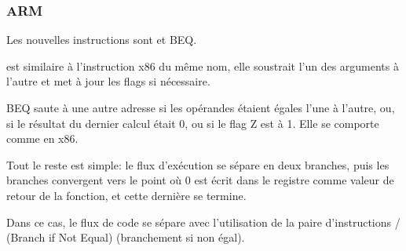 \subsubsection{ARM}





Les nouvelles instructions sont \CMP et \ac{BEQ}.

\CMP est similaire à l'instruction x86 du même nom, elle soustrait l'un des arguments
à l'autre et met à jour les flags si nécessaire.

\ac{BEQ} saute à une autre adresse si les opérandes étaient égales l'une à l'autre,
ou, si le résultat du dernier calcul était 0, ou si le flag Z est à 1.
Elle se comporte comme \JZ en x86.

Tout le reste est simple: le flux d'exécution se sépare en deux branches, puis les
branches convergent vers le point où 0 est écrit dans le registre  comme
valeur de retour de la fonction, et cette dernière se termine.




Dans ce cas, le flux de code se sépare avec l'utilisation de la paire d'instructions
/ (Branch if Not Equal) (branchement si non égal).

